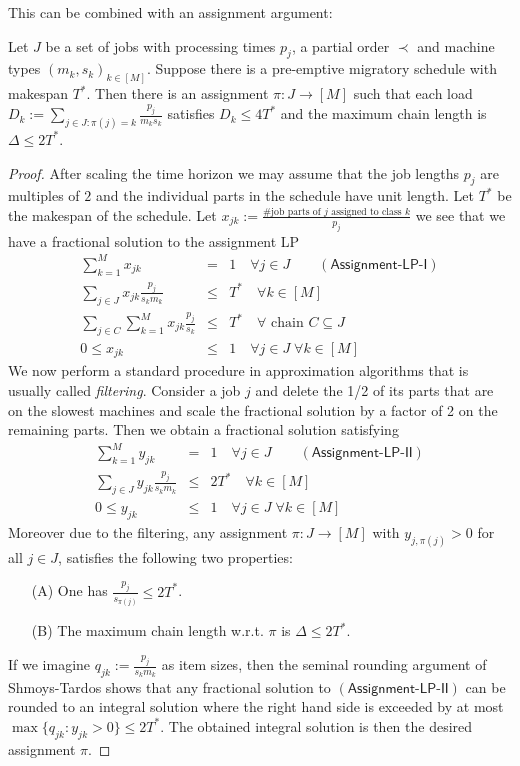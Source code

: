   This can be combined with an assignment argument:
  \begin{lemma} \label{lem:FindingIntegralAssignmentToSpeedClasses}
    Let $J$ be a set of jobs with processing times $p_j$, a partial order $\prec$ and machine types $(m_k,s_k)_{k \in [M]}$.
    Suppose there is a pre-emptive migratory schedule with makespan $T^*$.
    Then there is an assignment $\pi : J \to [M]$ such that each load $D_k := \sum_{j \in J: \pi(j) = k} \frac{p_j}{m_ks_k}$ satisfies $D_k \leq 4T^*$ and the maximum chain length is $\Delta \leq 2T^*$.
  \end{lemma}
  \begin{proof}
    After scaling the time horizon we may assume that the job lengths $p_j$ are multiples of $2$ and the individual parts
    in the schedule have unit length. Let $T^*$ be the makespan of the schedule. Let $x_{jk} := \frac{\#\textrm{job parts of }j\textrm{ assigned to class }k}{p_j}$ we see that we have a fractional solution to the assignment LP
  \begin{eqnarray*}
    \sum_{k=1}^M x_{jk} &=& 1 \quad \forall j \in J \quad \quad (\textsf{Assignment-LP-I}) \\
    \sum_{j \in J}  x_{jk}\frac{p_j}{s_km_k} &\leq& T^* \quad \forall k \in [M] \\
    \sum_{j \in C} \sum_{k=1}^M x_{jk}\frac{p_j}{s_k}  &\leq& T^* \quad \forall\textrm{ chain }C \subseteq J \\
           0 \leq x_{jk} &\leq& 1 \quad \forall j \in J \; \forall k \in [M]
  \end{eqnarray*}
  We now perform a standard procedure in approximation algorithms that is usually called \emph{filtering}.
  Consider a job $j$ and delete the 1/2 of its parts that are on the slowest machines and scale the fractional solution by a factor of 2 on the remaining parts. 
  Then we obtain a fractional solution satisfying
  \begin{eqnarray*}
    \sum_{k=1}^M y_{jk} &=& 1 \quad \forall j \in J \quad \quad (\textsf{Assignment-LP-II})\\
    \sum_{j \in J}  y_{jk}\frac{p_j}{s_km_k} &\leq& 2T^* \quad \forall k \in [M] \\
    0 \leq y_{jk} &\leq& 1 \quad \forall j \in J \; \forall k \in [M]
  \end{eqnarray*}
  Moreover due to the filtering, any assignment $\pi : J \to [M]$ with $y_{j,\pi(j)}>0$ for all $j \in J$, satisfies the following two properties:
  \begin{enumerate}
  \item[(A)] One has $\frac{p_j}{s_{\pi(j)}} \leq 2T^*$.
  \item[(B)] The maximum chain length w.r.t. $\pi$ is $\Delta \leq 2T^*$.
  \end{enumerate}
  If we imagine $q_{jk} := \frac{p_j}{s_km_k}$ as item sizes, then the seminal rounding argument of
  Shmoys-Tardos shows that any fractional solution to $(\textsf{Assignment-LP-II})$ can be rounded to an integral solution where the
  right hand side is exceeded by at most $\max\{ q_{jk} : y_{jk}>0\} \leq 2T^*$. The obtained integral solution is then the desired assignment $\pi$.
  \end{proof}
  
